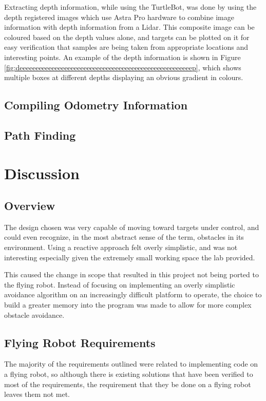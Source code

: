 \documentclass{article}[12]
\begin{document}
Extracting depth information, while using the TurtleBot, was done by using the depth registered images which use Astra Pro hardware to combine image information with depth information from a Lidar. This composite image can be coloured based on the depth values alone, and targets can be plotted on it for easy verification that samples are being taken from appropriate locations and interesting points. An example of the depth information is shown in Figure \ref{fig:deeeeeeeeeeeeeeeeeeeeeeeeeeeeeeeeeeeeeeeeeeeeeeeeeeeeeep}, which shows multiple boxes at different depths displaying an obvious gradient in colours.

\subsection{Compiling Odometry Information}

\subsection{Path Finding}


\section{Discussion}

\subsection{Overview}

	The design chosen was very capable of moving toward targets under control, and could even recognize, in the most abstract sense of the term, obstacles in its environment. Using a reactive approach felt overly simplistic, and was not interesting especially given the extremely small working space the lab provided.
	
	This caused the change in scope that resulted in this project not being ported to the flying robot. Instead of focusing on implementing an overly simplistic avoidance algorithm on an increasingly difficult platform to operate, the choice to build a greater memory into the program was made to allow for more complex obstacle avoidance.
	
	
\subsection{Flying Robot Requirements}

The majority of the requirements outlined were related to implementing code on a flying robot, so although there is existing solutions that have been verified to most of the requirements, the requirement that they be done on a flying robot leaves them not met.
\end{document}
